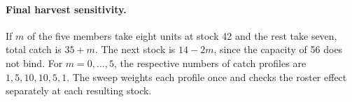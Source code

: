 \documentclass[letterpaper]{article}
\begin{document}
\paragraph{Final harvest sensitivity.}
If $m$ of the five members take eight units at stock 42 and the rest take seven, total catch is $35+m$. The next stock is $14-2m$, since the capacity of 56 does not bind. For $m=0,\ldots,5$, the respective numbers of catch profiles are $1,5,10,10,5,1$. The sweep weights each profile once and checks the roster effect separately at each resulting stock.
\end{document}
